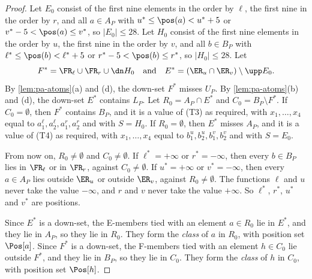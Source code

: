 \begin{proof}
Let $E_0$ consist of the first nine elements in the order by $\ell$, the first nine in the order by $r$, and all $a \in A_P$ with $u^* \leq \pos(a) < u^* + 5$ or $v^* - 5 < \pos(a) \leq v^*$, so $|E_0| \leq 28$.
Let $H_0$ consist of the first nine elements in the order by $u$, the first nine in the order by $v$, and all $b \in B_P$ with $\ell^* \leq \pos(b) < \ell^* + 5$ or $r^* - 5 < \pos(b) \leq r^*$, so $|H_0| \leq 28$.
Let
\[
F^* = \FR_\ell \cup \FR_r \cup \dn H_0 \quad\text{and}\quad E^* = (\ER_u \cap \ER_v) \setminus \upp E_0.
\]
By \cref{lem:pa-atoms}(a) and (d), the down-set $F^*$ misses $U_P$.
By \cref{lem:pa-atoms}(b) and (d), the down-set $E^*$ contains $L_P$.
Let $R_0 = A_P \cap E^*$ and $C_0 = B_P \setminus F^*$.
If $C_0 = \emptyset$, then $F^*$ contains $B_P$, and it is a value of (T3) as required, with $x_1, \dots, x_4$ equal to $a^\ell_1, a^\ell_2, a^r_1, a^r_2$ and with $S = H_0$.
If $R_0 = \emptyset$, then $E^*$ misses $A_P$, and it is a value of (T4) as required, with $x_1, \dots, x_4$ equal to $b^u_1, b^u_2, b^v_1, b^v_2$ and with $S = E_0$.

From now on, $R_0 \neq \emptyset$ and $C_0 \neq \emptyset$.
If $\ell^* = +\infty$ or $r^* = -\infty$, then every $b \in B_P$ lies in $\FR_\ell$ or in $\FR_r$, against $C_0 \neq \emptyset$.
If $u^* = +\infty$ or $v^* = -\infty$, then every $a \in A_P$ lies outside $\ER_u$ or outside $\ER_v$, against $R_0 \neq \emptyset$.
The functions $\ell$ and $u$ never take the value $-\infty$, and $r$ and $v$ never take the value $+\infty$.
So $\ell^*$, $r^*$, $u^*$ and $v^*$ are positions.

Since $E^*$ is a down-set, the E-members tied with an element $a \in R_0$ lie in $E^*$, and they lie in $A_P$, so they lie in $R_0$.
They form the \emph{class} of $a$ in $R_0$, with position set $\Pos[a]$.
Since $F^*$ is a down-set, the F-members tied with an element $h \in C_0$ lie outside $F^*$, and they lie in $B_P$, so they lie in $C_0$.
They form the \emph{class} of $h$ in $C_0$, with position set $\Pos[h]$.


\end{proof}
